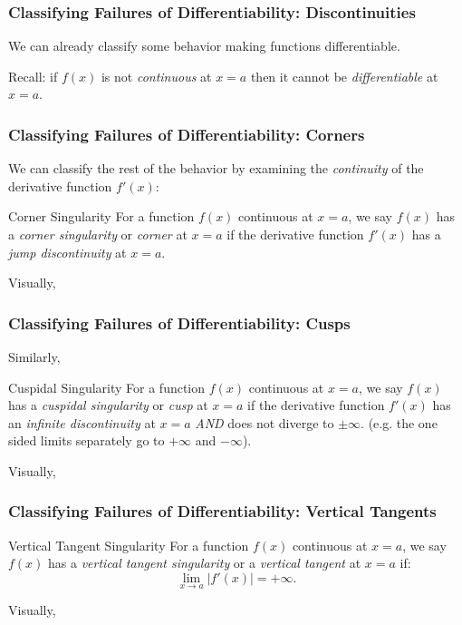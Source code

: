 \documentclass{ltx-talk}
\begin{document}
\begin{frame}
  \frametitle{Classifying Failures of Differentiability: Discontinuities}

  We can already classify some behavior making functions differentiable. \pause

  Recall: if $f(x)$ is not \textit{continuous} at $x = a$ then it cannot be \textit{differentiable} at $x = a$. 
  \vfill
\end{frame}

\begin{frame}
  \frametitle{Classifying Failures of Differentiability: Corners}
  We can classify the rest of the behavior by examining the \textit{continuity} of the derivative function $f'(x)$: \pause

  \begin{block}{Corner Singularity}
    For a function $f(x)$ continuous at $x = a$, we say $f(x)$ has a \textit{corner singularity} or \textit{corner} at $x = a$ \pause
    if the derivative function $f'(x)$ has a \textit{jump discontinuity} at $x = a$.
  \end{block} \pause
  Visually,
  \vfill
\end{frame}

\begin{frame}
  \frametitle{Classifying Failures of Differentiability: Cusps}
  Similarly, \pause
  \begin{block}{Cuspidal Singularity}
    For a function $f(x)$ continuous at $x = a$, we say $f(x)$ has a \textit{cuspidal singularity} or \textit{cusp} at $x = a$ \pause
    if the derivative function $f'(x)$ has an \textit{infinite discontinuity} at $x = a$ \pause \textit{AND} does not diverge to $\pm \infty$. \pause (e.g. the one sided limits separately go to $+\infty$ and $-\infty$). \pause
  \end{block}

  Visually,
  \vfill
\end{frame}

\begin{frame}
  \frametitle{Classifying Failures of Differentiability: Vertical Tangents}
  \begin{block}{Vertical Tangent Singularity}
    For a function $f(x)$ continuous at $x = a$, we say $f(x)$ has a \textit{vertical tangent singularity} or a \textit{vertical tangent} at $x = a$ \pause
    if:
    \begin{equation}
      \lim_{x \rightarrow a} |f'(x)| = + \infty.
    \end{equation}
  \end{block} \pause
  Visually, 
  \vfill
\end{frame}
\end{document}
